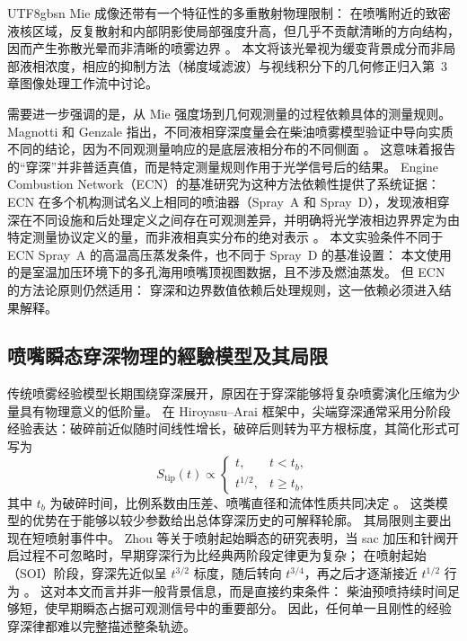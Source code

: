 \documentclass[english, 12pt, a4paper, elec, utf8, a-2b, online]{aaltothesis}
\begin{document}
\begin{CJK*}{UTF8}{gbsn}
Mie 成像还带有一个特征性的多重散射物理限制：
在喷嘴附近的致密液核区域，反复散射和内部阴影使局部强度升高，但几乎不贡献清晰的方向结构，
因而产生弥散光晕而非清晰的喷雾边界 \cite{BohrenHuffman2004,Linne2013SprayImaging}。
本文将该光晕视为缓变背景成分而非局部液相浓度，相应的抑制方法（梯度域滤波）与视线积分下的几何修正归入第~3 章图像处理工作流中讨论。

需要进一步强调的是，从 Mie 强度场到几何观测量的过程依赖具体的测量规则。
Magnotti 和 Genzale 指出，不同液相穿深度量会在柴油喷雾模型验证中导向实质不同的结论，因为不同观测量响应的是底层液相分布的不同侧面 \cite{MagnottiGenzale2013}。
这意味着报告的``穿深''并非普适真值，而是特定测量规则作用于光学信号后的结果。
Engine Combustion Network（ECN）的基准研究为这种方法依赖性提供了系统证据：
ECN 在多个机构测试名义上相同的喷油器（Spray~A 和 Spray~D），发现液相穿深在不同设施和后处理定义之间存在可观测差异，并明确将光学液相边界界定为由特定测量协议定义的量，而非液相真实分布的绝对表示 \cite{ecn_liquid_penetration,ecn_liquid_penetration_accessory,MeijerECN2012}。
本文实验条件不同于 ECN Spray~A 的高温高压蒸发条件，也不同于 Spray~D 的基准设置：
本文使用的是室温加压环境下的多孔海用喷嘴顶视图数据，且不涉及燃油蒸发。
但 ECN 的方法论原则仍然适用：
穿深和边界数值依赖后处理规则，这一依赖必须进入结果解释。

\subsection{喷嘴瞬态穿深物理的經驗模型及其局限}

传统喷雾经验模型长期围绕穿深展开，原因在于穿深能够将复杂喷雾演化压缩为少量具有物理意义的低阶量。
在 Hiroyasu--Arai 框架中，尖端穿深通常采用分阶段经验表达：破碎前近似随时间线性增长，破碎后则转为平方根标度，其简化形式可写为
\[
S_{\mathrm{tip}}(t)\propto
\begin{cases}
t, & t<t_b,\\
t^{1/2}, & t\ge t_b,
\end{cases}
\]
其中 \(t_b\) 为破碎时间，比例系数由压差、喷嘴直径和流体性质共同决定 \cite{HiroyasuArai1990}。
这类模型的优势在于能够以较少参数给出总体穿深历史的可解释轮廓。
其局限则主要出现在短喷射事件中。
Zhou 等关于喷射起始瞬态的研究表明，当 sac 加压和针阀开启过程不可忽略时，早期穿深行为比经典两阶段定律更为复杂；
在喷射起始（SOI）阶段，穿深先近似呈 \(t^{3/2}\) 标度，随后转向 \(t^{3/4}\)，再之后才逐渐接近 \(t^{1/2}\) 行为 \cite{ZhouLiYi2021}。
这对本文而言并非一般背景信息，而是直接约束条件：
柴油预喷持续时间足够短，使早期瞬态占据可观测信号中的重要部分。
因此，任何单一且刚性的经验穿深律都难以完整描述整条轨迹。


\end{CJK*}
\end{document}
